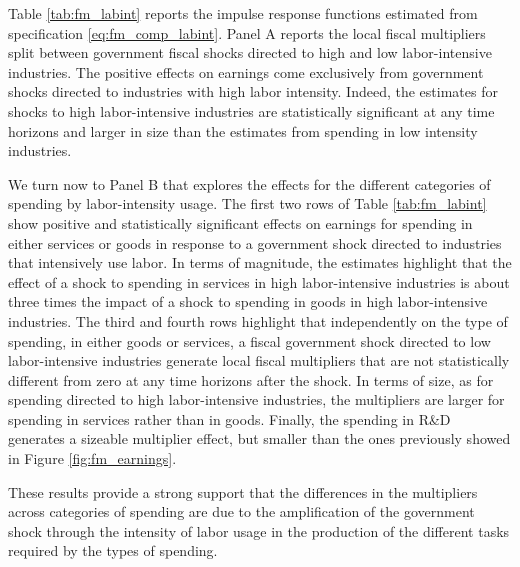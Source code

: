 \documentclass[dv_diss_main.tex]{subfiles}
\begin{document}
Table \ref{tab:fm_labint} reports the impulse response functions estimated from specification \eqref{eq:fm_comp_labint}. Panel A reports the local fiscal multipliers split between government fiscal shocks directed to high and low labor-intensive industries. The positive effects on earnings come exclusively from government shocks directed to industries with high labor intensity. Indeed, the estimates for shocks to high labor-intensive industries are statistically significant at any time horizons and larger in size than the estimates from spending in low intensity industries.

We turn now to Panel B that explores the effects for the different categories of spending by labor-intensity usage. The first two rows of Table \ref{tab:fm_labint} show positive and statistically significant effects on earnings for spending in either services or goods in response to a government shock directed to industries that intensively use labor. In terms of magnitude, the estimates highlight that the effect of a shock to spending in services in high labor-intensive industries is about three times the impact of a shock to spending in goods in high labor-intensive industries. The third and fourth rows highlight that independently on the type of spending, in either goods or services, a fiscal government shock directed to low labor-intensive industries generate local fiscal multipliers that are not statistically different from zero at any time horizons after the shock. In terms of size, as for spending directed to high labor-intensive industries, the multipliers are larger for spending in services rather than in goods. Finally, the spending in R\&D generates a sizeable multiplier effect, but smaller than the ones previously showed in Figure \ref{fig:fm_earnings}.

These results provide a strong support that the differences in the multipliers across categories of spending are due to the amplification of the government shock through the intensity of labor usage in the production of the different tasks required by the types of spending.









\end{document}
